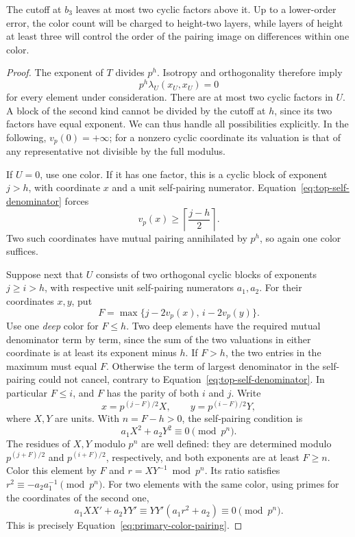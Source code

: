 The cutoff at \(b_3\) leaves at most two cyclic factors above it.
Up to a lower-order error, the color count will be charged to height-two
layers, while layers of height at least three will control the order of
the pairing image on differences within one color.

\begin{proof}
The exponent of \(T\) divides \(p^h\). Isotropy and orthogonality
therefore imply
\begin{equation}\label{eq:top-self-denominator}
 p^h\lambda_U(x_U,x_U)=0
\end{equation}
for every element under consideration. There are at most two cyclic
factors in \(U\). A block of the second kind cannot be divided by
the cutoff at \(h\), since its two factors have equal exponent.
We can thus handle all possibilities explicitly. In the following,
\(v_p(0)=+\infty\); for a nonzero cyclic coordinate its valuation is
that of any representative not divisible by the full modulus.

If \(U=0\), use one color. If it has one factor, this is a cyclic
block of exponent \(j>h\), with coordinate \(x\) and a unit
self-pairing numerator. Equation~\eqref{eq:top-self-denominator}
forces
\[
 v_p(x)\ge \left\lceil\frac{j-h}{2}\right\rceil.
\]
Two such coordinates have mutual pairing annihilated by \(p^h\),
so again one color suffices.

Suppose next that \(U\) consists of two orthogonal cyclic blocks of
exponents \(j\ge i>h\), with respective unit self-pairing numerators
\(a_1,a_2\). For their coordinates \(x,y\), put
\[
 F=\max\{j-2v_p(x),\,i-2v_p(y)\}.
\]
Use one \emph{deep} color for \(F\le h\). Two deep elements have the
required mutual denominator term by term, since the sum of the two
valuations in either coordinate is at least its exponent minus \(h\).
If \(F>h\), the two entries in the maximum must equal \(F\).
Otherwise the term of largest denominator in the self-pairing
could not cancel, contrary to
Equation~\eqref{eq:top-self-denominator}. In particular \(F\le i\),
and \(F\) has the parity of both \(i\) and \(j\). Write
\[
 x=p^{(j-F)/2}X,\qquad y=p^{(i-F)/2}Y,
\]
where \(X,Y\) are units. With \(n=F-h>0\), the self-pairing
condition is
\[
 a_1X^2+a_2Y^2\equiv0\pmod{p^n}.
\]
The residues of \(X,Y\) modulo \(p^n\) are well defined: they are
determined modulo \(p^{(j+F)/2}\) and \(p^{(i+F)/2}\), respectively,
and both exponents are at least \(F\ge n\).
Color this element by \(F\) and
\(r=XY^{-1}\bmod p^n\). Its ratio satisfies
\(r^2\equiv-a_2a_1^{-1}\pmod{p^n}\). For two elements with the
same color, using primes for the coordinates of the second one,
\[
 a_1XX'+a_2YY'
 \equiv YY'(a_1r^2+a_2)\equiv0\pmod{p^n}.
\]
This is precisely Equation~\eqref{eq:primary-color-pairing}.


\end{proof}

